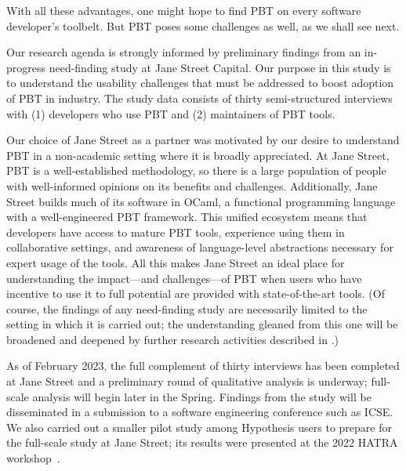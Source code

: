 With all these advantages, one might hope to find PBT on every
software developer's toolbelt.  But PBT poses some challenges as well,
as we shall see next.

%
Our research agenda is strongly informed by preliminary findings from
an in-progress need-finding study at Jane Street Capital.  Our purpose
in this
study is to understand the usability challenges that must be addressed
to boost adoption of PBT in
industry. The study data consists of thirty semi-structured interviews
with (1) developers who use PBT and (2) maintainers of PBT tools.

Our choice of Jane Street as a partner was motivated by our desire to
understand PBT in a non-academic setting where it is broadly appreciated.
At Jane Street, PBT is a
well-established methodology, so there is a large
population of people with well-informed opinions on its benefits and
challenges. Additionally, Jane Street builds much of its
software in OCaml, a functional programming language with
a well-engineered PBT framework.
%
This unified
ecosystem means that developers have access to mature PBT tools,
experience using them in collaborative settings,
and awareness of language-level abstractions necessary
for expert usage of the tools.
%
All this makes Jane Street an ideal place for understanding the
impact---and challenges---of PBT when users who have incentive to use
it to full potential are provided with state-of-the-art tools.
%
(Of course, the findings of any need-finding study are necessarily
limited to the setting in which it is carried out; the understanding
gleaned from this one will be broadened and deepened by further
research activities described in .)

As of February 2023, the full complement of thirty interviews has been
completed at Jane Street and a preliminary round of qualitative
analysis is underway; full-scale analysis will begin later in the Spring.
Findings from the study will be disseminated in a submission to a
software engineering conference such as ICSE.  We also carried out a
smaller pilot study among Hypothesis users to prepare for the
full-scale study at Jane Street; its results were presented at the
2022 HATRA workshop~\cite{goldstein_problems_2022}.

\ifthemecolors{}\fi
\newcommand{\proptheme}[1]{{\ifthemecolors\color{nord-orange}\fi \em #1}}
\newcommand{\gentheme}[1]{{\ifthemecolors\color{nord-green}\fi \em #1}}
\newcommand{\evaltheme}[1]{{\ifthemecolors\color{nord-purple}\fi \em #1}}
\newcommand{\edutheme}[1]{{\ifthemecolors\color{nord-frost4}\fi \em #1}}

